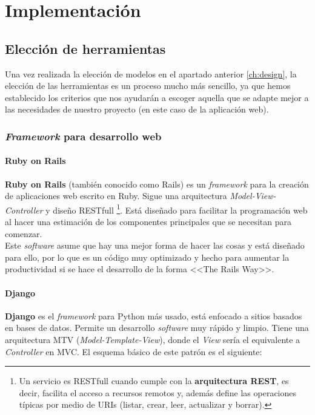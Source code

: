 \chapter{Implementación}

\section{Elección de herramientas} \label{sec:tools}
Una vez realizada la elección de modelos en el apartado anterior \ref{ch:design}, la
elección de las herramientas es un proceso mucho más sencillo, ya que hemos establecido
los criterios que nos ayudarán a escoger aquella que se adapte mejor a las necesidades
de nuestro proyecto (en este caso de la aplicación web).

\subsection{\textit{Framework} para desarrollo web}

    \subsubsection{Ruby on Rails}
    \textbf{Ruby on Rails} (también conocido como Rails) \cite{ruby-on-rails} es un
    \textit{framework} para la creación de aplicaciones web escrito en Ruby. Sigue una
    arquitectura \textit{Model-View-Controller} y diseño RESTfull \footnote{Un servicio
    es RESTfull cuando cumple con la \textbf{arquitectura REST}, es decir, facilita el
    acceso a recursos remotos y, además define las operaciones típicas por medio de URIs
    (listar, crear, leer, actualizar y borrar).}. Está diseñado para facilitar la
    programación web al hacer una estimación de los componentes principales que se
    necesitan para comenzar.\\

    Este \textit{software} asume que hay una mejor forma de hacer las cosas y está diseñado
    para ello, por lo que es un código muy optimizado y hecho para aumentar la productividad
    si se hace el desarrollo de la forma <<The Rails Way>>.

    \subsubsection{Django}
    \textbf{Django} \cite{django} es el \textit{framework} para Python más usado, está
    enfocado a sitios basados en bases de datos. Permite un desarrollo \textit{software}
    muy rápido y limpio. Tiene una arquitectura MTV (\textit{Model-Template-View}), donde el
    \textit{View} sería el equivalente a \textit{Controller} en MVC. El esquema básico de este
    patrón es el siguiente:

